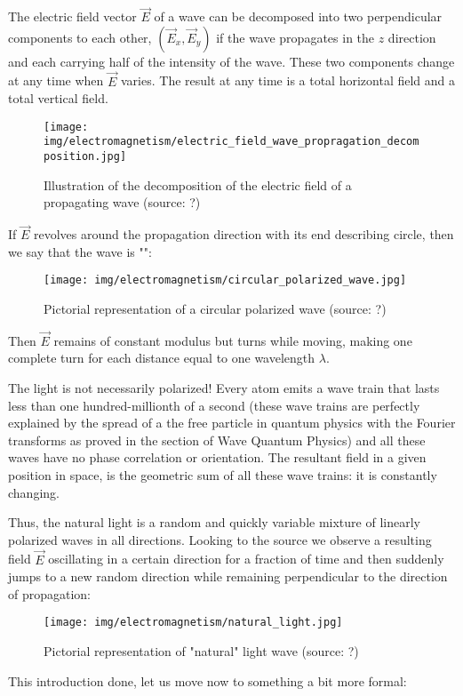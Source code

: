 	The electric field vector $\vec{E}$ of a wave can be decomposed into two perpendicular components to each other, $(\vec{E}_x,\vec{E}_y)$ if the wave propagates in the $z$ direction and each carrying half of the intensity of the wave. These two components change at any time when $\vec{E}$ varies. The result at any time is a total horizontal field and a total vertical field.
	\begin{figure}[H]
		\centering
		\texttt{[image: img/electromagnetism/electric\_field\_wave\_propragation\_decomposition.jpg]}
		\caption{Illustration of the decomposition of the electric field of a propagating wave (source: ?)}
	\end{figure}
	If $\vec{E}$ revolves around the propagation direction with its end describing circle, then we say that the wave is "":
	\begin{figure}[H]
		\centering
		\texttt{[image: img/electromagnetism/circular\_polarized\_wave.jpg]}
		\caption{Pictorial representation of a circular polarized wave (source: ?)}
	\end{figure}
	Then $\vec{E}$ remains of constant modulus but turns while moving, making one complete turn for each distance equal to one wavelength $\lambda$.
	\begin{tcolorbox}[title=Remark,colframe=black,arc=10pt]
	The light is not necessarily polarized! Every atom emits a wave train that lasts less than one hundred-millionth of a second (these wave trains are perfectly explained by the spread of a the free particle in quantum physics with the Fourier transforms as proved in the section of Wave Quantum Physics) and all these waves have no phase correlation or orientation. The resultant field in a given position in space, is the geometric sum of all these wave trains: it is constantly changing.
	\end{tcolorbox}
	Thus, the natural light is a random and quickly variable mixture of linearly polarized waves in all directions. Looking to the source we observe a resulting field $\vec{E}$ oscillating in a certain direction for a fraction of time and then suddenly jumps to a new random direction while remaining perpendicular to the direction of propagation:
	\begin{figure}[H]
		\centering
		\texttt{[image: img/electromagnetism/natural\_light.jpg]}
		\caption{Pictorial representation of "natural" light wave (source: ?)}
	\end{figure}
	This introduction done, let us move now to something a bit more formal:

